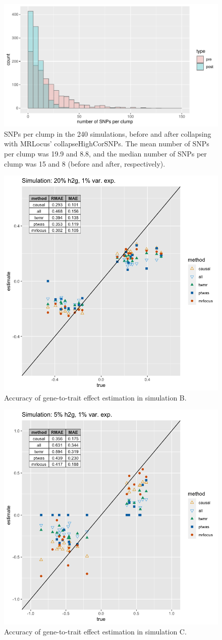 \documentclass[11pt]{article}
\begin{document}
\begin{figure}[!ht]
  \centering
  \includegraphics[width=.7\textwidth]{figs/snps-per-clump}
  \caption{SNPs per clump in the 240 simulations, before and after
    collapsing with MRLocus’ collapseHighCorSNPs. The mean number of
    SNPs per clump was 19.9 and 8.8, and the median number of SNPs per
    clump was 15 and 8 (before and after, respectively).} 
\end{figure}

\begin{figure}[!ht]
  \centering
  \includegraphics[width=.6\textwidth]{figs/sim3.png}
  \caption{Accuracy of gene-to-trait effect estimation in simulation B.}
\end{figure}

\begin{figure}[!ht]
  \centering
  \includegraphics[width=.6\textwidth]{figs/sim2.png}
  \caption{Accuracy of gene-to-trait effect estimation in simulation C.}
\end{figure}
\end{document}
